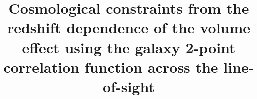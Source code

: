 \documentclass[iop]{emulateapj}
\begin{document}

\title{Cosmological constraints from the redshift dependence of the volume effect using the galaxy 2-point correlation function across the line-of-sight}



\end{document}
